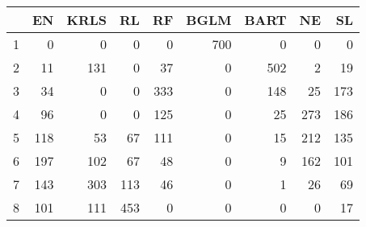 \begin{table}[ht]
\centering
\begin{tabular}{rrrrrrrrr}
  \hline
 & EN & KRLS & RL & RF & BGLM & BART & NE & SL \\ 
  \hline
1 &   0 &   0 &   0 &   0 & 700 &   0 &   0 &   0 \\ 
  2 &  11 & 131 &   0 &  37 &   0 & 502 &   2 &  19 \\ 
  3 &  34 &   0 &   0 & 333 &   0 & 148 &  25 & 173 \\ 
  4 &  96 &   0 &   0 & 125 &   0 &  25 & 273 & 186 \\ 
  5 & 118 &  53 &  67 & 111 &   0 &  15 & 212 & 135 \\ 
  6 & 197 & 102 &  67 &  48 &   0 &   9 & 162 & 101 \\ 
  7 & 143 & 303 & 113 &  46 &   0 &   1 &  26 &  69 \\ 
  8 & 101 & 111 & 453 &   0 &   0 &   0 &   0 &  17 \\ 
   \hline
\end{tabular}
\end{table}
